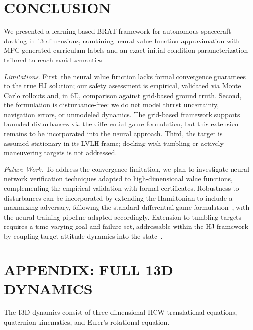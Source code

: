 \documentclass[letterpaper, 10 pt, conference]{ieeeconf}
\begin{document}
\addtolength{\textheight}{-5cm}

\section{CONCLUSION}

We presented a learning-based BRAT framework for autonomous spacecraft docking in 13 dimensions, combining neural value function approximation with MPC-generated curriculum labels and an exact-initial-condition parameterization tailored to reach-avoid semantics.

\textit{Limitations.}
First, the neural value function lacks formal convergence guarantees to the true HJ solution; our safety assessment is empirical, validated via Monte Carlo rollouts and, in 6D, comparison against grid-based ground truth.
Second, the formulation is disturbance-free: we do not model thrust uncertainty, navigation errors, or unmodeled dynamics. The grid-based framework supports bounded disturbances via the differential game formulation, but this extension remains to be incorporated into the neural approach.
Third, the target is assumed stationary in its LVLH frame; docking with tumbling or actively maneuvering targets is not addressed.

\textit{Future Work.}
To address the convergence limitation, we plan to investigate neural network verification techniques adapted to high-dimensional value functions, complementing the empirical validation with formal certificates.
Robustness to disturbances can be incorporated by extending the Hamiltonian to include a maximizing adversary, following the standard differential game formulation~\cite{mitchell2005}, with the neural training pipeline adapted accordingly.
Extension to tumbling targets requires a time-varying goal and failure set, addressable within the HJ framework by coupling target attitude dynamics into the state~\cite{mote2023}.

\section*{APPENDIX: FULL 13D DYNAMICS}

The 13D dynamics consist of three-dimensional HCW translational equations, quaternion kinematics, and Euler's rotational equation.
\end{document}

